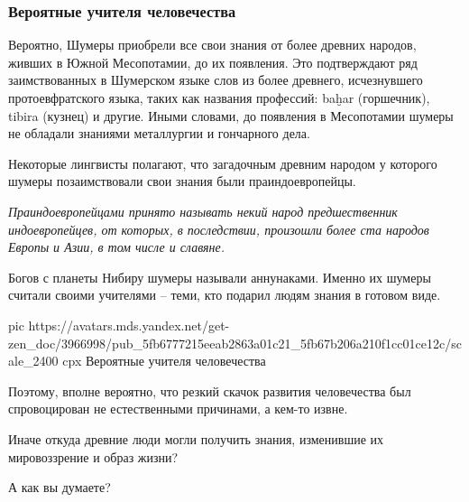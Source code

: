\subsubsection{Вероятные учителя человечества}

Вероятно, Шумеры приобрели все свои знания от более древних народов, живших в
Южной Месопотамии, до их появления. Это подтверждают ряд заимствованных в
Шумерском языке слов из более древнего, исчезнувшего протоевфратского языка,
таких как названия профессий: baḫar (горшечник), tibira (кузнец) и другие.
Иными словами, до появления в Месопотамии шумеры не обладали знаниями
металлургии и гончарного дела.

Некоторые лингвисты полагают, что загадочным древним народом у которого шумеры
позаимствовали свои знания были праиндоевропейцы.

\begin{leftbar}
	\begingroup
		\em Праиндоевропейцами принято называть некий народ предшественник
				индоевропейцев, от которых, в последствии, произошли более ста народов
				Европы и Азии, в том числе и славяне. 
	\endgroup
\end{leftbar}

Богов с планеты Нибиру шумеры называли аннунаками. Именно их шумеры считали
своими учителями – теми, кто подарил людям знания в готовом виде.

\ifcmt
  pic https://avatars.mds.yandex.net/get-zen_doc/3966998/pub_5fb6777215eeab2863a01c21_5fb67b206a210f1cc01ce12c/scale_2400
	cpx Вероятные учителя человечества
\fi

Поэтому, вполне вероятно, что резкий скачок развития человечества был
спровоцирован не естественными причинами, а кем-то извне.

Иначе откуда древние люди могли получить знания, изменившие их мировоззрение и
образ жизни?

А как вы думаете?
